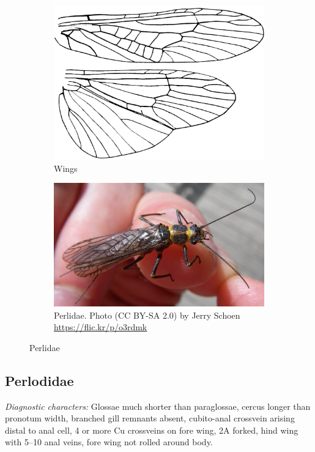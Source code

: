 \documentclass[letterpaper, 11pt]{article}
\begin{document}
\begin{figure}[ht!]
    \centering
    \begin{subfigure}[ht!]{0.45\textwidth}
        \includegraphics[width=\textwidth]{PerlidWings}
        \caption{Wings \citep[modified from][Plate 11, Fig. 3]{bhl29875}}
        \label{fig:perlid1}
    \end{subfigure}
    \qquad
    \begin{subfigure}[ht!]{0.45\textwidth}
        \includegraphics[width=\textwidth]{perlid}
        \caption{Perlidae. Photo (CC BY-SA 2.0) by Jerry Schoen \url{https://flic.kr/p/o3rdmk}}
        \label{fig:perlid2}
    \end{subfigure}
    \caption{Perlidae}\label{fig:perlids}
\end{figure}

\subsection{Perlodidae}
\noindent{}\textit{Diagnostic characters:} Glossae much shorter than paraglossae, cercus longer than pronotum width, branched gill remnants absent, cubito-anal crossvein arising distal to anal cell, 4 or more Cu crossveins on fore wing, 2A forked, hind wing with 5--10 anal veins, fore wing not rolled around body.\\
\end{document}
